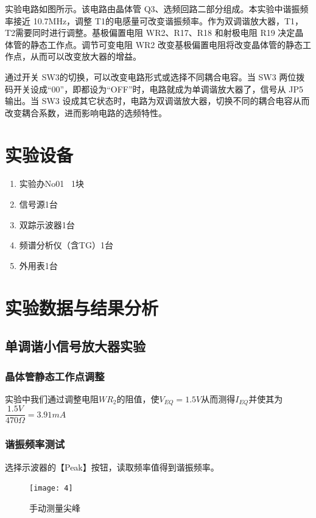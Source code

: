 \documentclass{../source/Experiment}
\begin{document}
    实验电路如图所示。该电路由晶体管 Q3、选频回路二部分组成。本实验中谐振频率接近 10.7MHz，调整 T1的电感量可改变谐振频率。作为双调谐放大器，T1，T2需要同时进行调整。基极偏置电阻 WR2、R17、R18 和射极电阻 R19 决定晶体管的静态工作点。调节可变电阻 WR2 改变基极偏置电阻将改变晶体管的静态工作点，从而可以改变放大器的增益。
    
    通过开关 SW3的切换，可以改变电路形式或选择不同耦合电容。当 SW3 两位拨码开关设成“00”，即都设为“OFF”时，电路就成为单调谐放大器了，信号从 JP5 输出。当 SW3 设成其它状态时，电路为双调谐放大器，切换不同的耦合电容从而改变耦合系数，进而影响电路的选频特性。

    \section{实验设备}
        \begin{enumerate}
            \item 实验办No01 \, 1块
            \item 信号源1台
            \item 双踪示波器1台
            \item 频谱分析仪（含TG）1台
            \item 外用表1台
        \end{enumerate}
        
    \section{实验数据与结果分析}
        \subsection{单调谐小信号放大器实验}
            \subsubsection{晶体管静态工作点调整}
            
            实验中我们通过调整电阻$WR_2$的阻值，使$V_{EQ} = 1.5V$从而测得$I_{EQ}$并使其为$\dfrac{1.5V}{470\Omega} = 3.91mA$
            
            \subsubsection{谐振频率测试}

            选择示波器的【Peak】按钮，读取频率值得到谐振频率。

            \begin{figure}[H]
                \centering
                \texttt{[image: 4]}
                \caption{手动测量尖峰}
            \end{figure}
\end{document}
